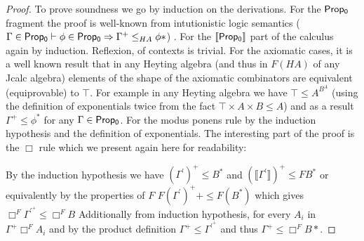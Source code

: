 			\begin{proof}
				To prove soundness we go by induction on the derivations. 
				For the ${\sf Prop_0}$ fragment
				the proof is well-known from intutionistic logic semantics ($\Gamma\in{\sf Prop_0}\vdash \phi\in {\sf Prop_0}
				\Rightarrow \Gamma^+\le_{HA}\phi *$)
				. 
				For the ${\sf \llbracket Prop_0\rrbracket}$ part of the calculus again by induction.
				Reflexion, of contexts is trivial. For the axiomatic cases, it is a well known result
				that in any Heyting algebra (and thus in $F(HA)$ of any Jcalc algebra) 
				elements of the shape of the axiomatic combinators are equivalent (equiprovable) to $\top$.
				For example in any Heyting algebra  we have $\top\le A^{B^A}$ 
				(using the definition of exponentials twice from the fact $\top\times A\times B\le A$) and as a result 
				$\Gamma^+\leq\phi^{*}$ for any $\Gamma\in {\sf Prop_0}$.
				For the modus ponens rule by the induction hypothesis and the definition of exponentials.
				The interesting part of the proof is the $\Box$ rule which we present again here for readability:
				\begin{mdframed}[nobreak=true, frametitle={\footnotesize Judgments on Necessity with $\Gamma\in {\sf Prop_1} \text{,{\ \sf length}}(\Gamma)=i\text{,\ }
					\ 1\le k\le i  \text{\ and, }\Gamma^{\prime},A, A_k,  B\in {\sf Prop_0}$ }]
				\mbox{\footnotesize
					\begin{mathpar}
						
						\inferrule*[right=$I_{\Box B}E^{\vec{x},\vec{s}}_{\Box A_1\ldots \Box A_i}$]{{(\forall  A_i \in \Gamma'. \ \Turn {\Gamma}{\Box  A_i})}\\{\Turn {\Gamma'} { B}}\\{\Turn {\llbracket \Gamma' \rrbracket} {\llbracket  B\rrbracket} }} {\Turn {\Gamma}\Box  B}

					\end{mathpar}}
				\end{mdframed}
				
				By the induction hypothesis we have $(\Gamma^{'})^{+}\le B^{*}$
				and $(\llbracket\Gamma^{'}\rrbracket)^{+}\le FB^{*}$ or equivalently by the properties of $F$
				$F(\Gamma^{'})^{+}+\le F(B^{*})$ which gives $\Box^F{\Gamma^{'}^{+}}\le \Box^F B$
				Additionally from induction hypothesis, for every $A_i$ in $\Gamma^{+}\Box^F A_i$
				and by the product definition $\Gamma^{+}\le\Gamma^{'}^{+}$ and thus
				$\Gamma^{+}\le\Box^F B*$.


\end{proof}
